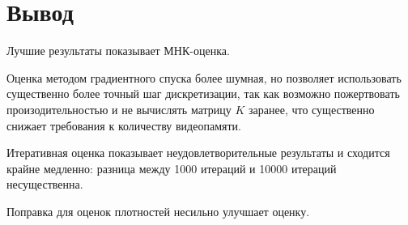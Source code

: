 \documentclass[../paper.tex]{subfiles}
\begin{document}
\chapter{Вывод}
Лучшие результаты показывает МНК-оценка.

Оценка методом градиентного спуска более шумная, но позволяет использовать
существенно более точный шаг дискретизации, так как возможно пожертвовать
произодительностью и не вычислять матрицу $K$ заранее, что существенно снижает
требования к количеству видеопамяти. 

Итеративная оценка показывает неудовлетворительные результаты и сходится крайне
медленно: разница между 1000 итераций и 10000 итераций несущественна.

Поправка для оценок плотностей несильно улучшает оценку.
\end{document}
